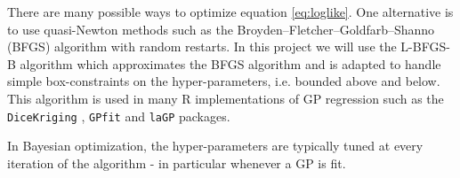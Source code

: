 There are many possible ways to optimize equation \ref{eq:loglike}. One alternative is to use quasi-Newton methods such as the Broyden–Fletcher–Goldfarb–Shanno (BFGS) algorithm with random restarts. In this project we will use the L-BFGS-B algorithm \cite{byrd1995limited} which approximates the BFGS algorithm and is adapted to handle simple box-constraints on the hyper-parameters, i.e. bounded above and below. This algorithm is used in many R implementations of GP regression such as the \texttt{DiceKriging} \cite{roustant2012dicekriging}, \texttt{GPfit} \cite{macdonald2013gpfit} and \texttt{laGP} \cite{gramacy2016lagp} packages.

In Bayesian optimization, the hyper-parameters are typically tuned at every iteration of the algorithm - in particular whenever a GP is fit.